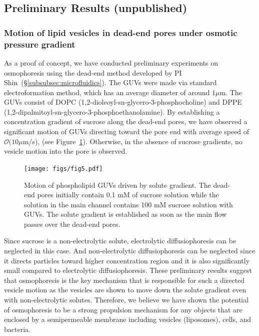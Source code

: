 \documentclass[11pt]{article}
\begin{document}
\subsection{Preliminary Results (unpublished)
\label{subsec:preliminary_results}}
\subsubsection{Motion of lipid vesicles in dead-end pores under osmotic
pressure gradient}
\label{subsubsec:osmophoresis_lipid_vesicles_deadend_pores}
As a proof of concept, we have conducted preliminary experiments on
osmophoresis using the dead-end method developed by PI
Shin~(\S\ref{subsubsec:microfluidics}).  The GUVs were made via standard
electroformation method, which has an average diameter of around $1
\mu$m. The GUVs consist of DOPC
(1,2-dioleoyl-sn-glycero-3-phosphocholine) and DPPE
(1,2-dipalmitoyl-sn-glycero-3-phosphoethanolamine).  By establishing a
concentration gradient of sucrose along the dead-end pores, we have
observed a significant motion of GUVs directing toward the pore end with
average speed of $\mathcal{O}(10 \mu$m/s), (see Figure~\ref{fig:fig5}).
Otherwise, in the absence of sucrose gradients, no vesicle motion into
the pore is observed.
%
\begin{figure}[h]
\begin{center}
\texttt{[image: figs/fig5.pdf]}
\caption{\label{fig:fig5} Motion of phospholipid GUVs driven by solute
  gradient. The dead-end pores initially contain 0.1 mM of sucrose
  solution while the solution in the main channel contains 100 mM
  sucrose solution with GUVs.  The solute gradient is established as
  soon as the main flow passes over the dead-end pores.}
\end{center}
\end{figure}
Since sucrose is a non-electrolytic solute, electrolytic
diffusiophoresis can be neglected in this case.  And non-electrolytic
diffusiophoresis can be neglected since it directs particles toward
higher concentration region and it is also significantly small compared
to electrolytic diffusiophoresis.  These preliminary results suggest
that osmophoresis is the key mechanism that is responsible for such a
directed vesicle motion as the vesicles are shown to move down the
solute gradient even with non-electrolytic solutes.  Therefore, we
believe we have shown the potential of osmophoresis to be a strong
propulsion mechanism for any objects that are enclosed by a
semipermeable membrane including vesicles (liposomes), cells, and
bacteria.
\end{document}
